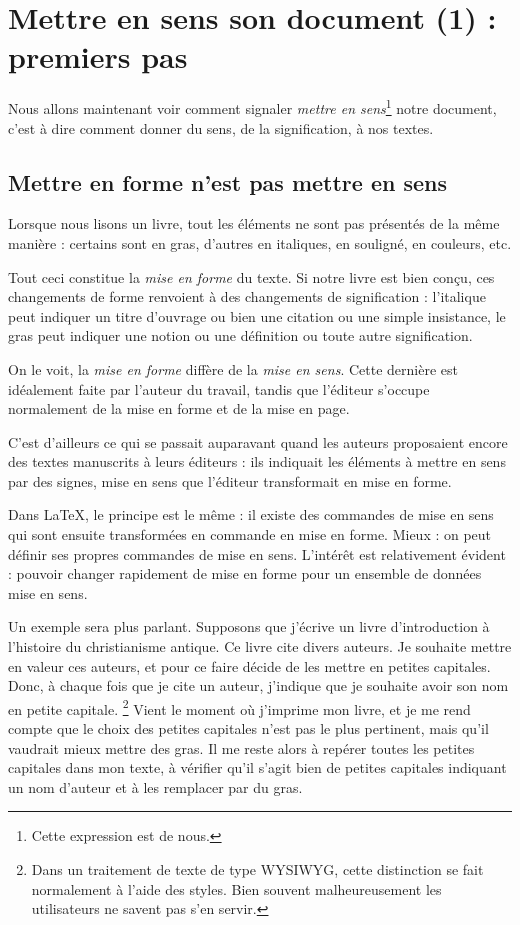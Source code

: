 \chapter{Mettre en sens son document (1) : premiers pas}

\begin{prealable}
	Nous allons maintenant voir comment signaler \emph{mettre en sens}\footnote{Cette expression est de nous.} notre document, c'est à dire comment donner du sens, de la signification, à nos textes.
\end{prealable}

\section{Mettre en forme n'est pas mettre en sens}

Lorsque nous lisons un livre, tout les éléments ne sont pas présentés de la même manière : certains sont en gras, d'autres en italiques, en souligné, en couleurs, etc. 

Tout ceci constitue la \emph{mise en forme} du texte. Si notre livre est bien conçu, ces changements de forme renvoient à des changements de signification : l'italique peut indiquer un titre d'ouvrage ou bien une citation ou une simple insistance, le gras peut indiquer une notion ou une définition ou toute autre signification.

On le voit, la \emph{mise en forme} diffère de la \emph{mise en sens}. Cette dernière est idéalement faite par l'auteur du travail, tandis que l'éditeur s'occupe normalement de la mise en forme et de la mise en page.

C'est d'ailleurs ce qui se passait auparavant quand les auteurs proposaient encore des textes manuscrits à leurs éditeurs : ils indiquait les éléments à mettre en sens par des signes, mise en sens que l'éditeur transformait en mise en forme.

Dans \LaTeX, le principe est le même : il existe des commandes de mise en sens qui sont ensuite transformées en commande en mise en forme. Mieux : on peut définir ses propres commandes de mise en sens. L'intérêt est relativement évident : pouvoir changer rapidement de mise en forme pour un ensemble de données mise en sens.

Un exemple sera plus parlant. Supposons que j'écrive un livre d'introduction à l'histoire du christianisme antique. Ce livre cite divers auteurs. Je souhaite mettre en valeur ces auteurs, et pour ce faire décide de les mettre en petites capitales.
Donc, à chaque fois que je cite un auteur, j'indique que je souhaite avoir son nom en petite capitale.
\footnote{Dans un traitement de texte de type WYSIWYG, cette distinction se fait normalement à l'aide des styles. Bien souvent malheureusement les utilisateurs ne savent pas s'en servir.}
Vient le moment où j'imprime mon livre, et je me rend compte que le choix des petites capitales n'est pas le plus pertinent, mais qu'il vaudrait mieux mettre des gras. Il me reste alors à repérer toutes les petites capitales dans mon texte, à vérifier qu'il s'agit bien de petites capitales indiquant un nom d'auteur et à les remplacer par du gras.

